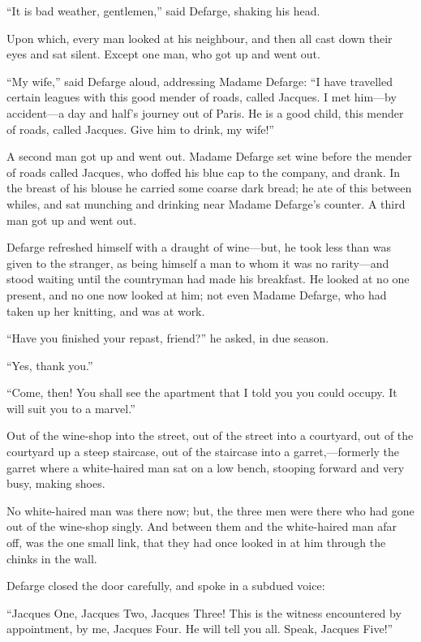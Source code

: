 ``It is bad weather, gentlemen,'' said Defarge, shaking his head.

Upon which, every man looked at his neighbour, and then all cast down
their eyes and sat silent.  Except one man, who got up and went out.

``My wife,'' said Defarge aloud, addressing Madame Defarge:  ``I have
travelled certain leagues with this good mender of roads, called
Jacques.  I met him---by accident---a day and half's journey out of
Paris.  He is a good child, this mender of roads, called Jacques.
Give him to drink, my wife!''

A second man got up and went out.  Madame Defarge set wine before the
mender of roads called Jacques, who doffed his blue cap to the company,
and drank.  In the breast of his blouse he carried some coarse dark
bread; he ate of this between whiles, and sat munching and drinking
near Madame Defarge's counter.  A third man got up and went out.

Defarge refreshed himself with a draught of wine---but, he took less
than was given to the stranger, as being himself a man to whom it was
no rarity---and stood waiting until the countryman had made his breakfast.
He looked at no one present, and no one now looked at him; not even
Madame Defarge, who had taken up her knitting, and was at work.

``Have you finished your repast, friend?'' he asked, in due season.

``Yes, thank you.''

``Come, then!  You shall see the apartment that I told you you could
occupy.  It will suit you to a marvel.''

Out of the wine-shop into the street, out of the street into a
courtyard, out of the courtyard up a steep staircase, out of the
staircase into a garret,---formerly the garret where a white-haired
man sat on a low bench, stooping forward and very busy, making shoes.

No white-haired man was there now; but, the three men were there
who had gone out of the wine-shop singly.  And between them and the
white-haired man afar off, was the one small link, that they had once
looked in at him through the chinks in the wall.

Defarge closed the door carefully, and spoke in a subdued voice:

``Jacques One, Jacques Two, Jacques Three!  This is the witness
encountered by appointment, by me, Jacques Four.  He will tell you all.
Speak, Jacques Five!''

